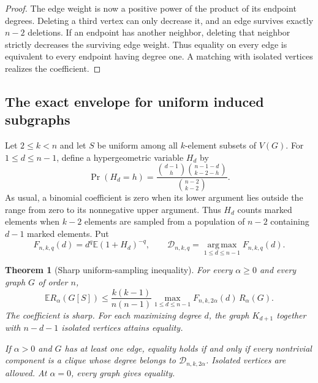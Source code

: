 \documentclass[11pt,a4paper]{article}
\newtheorem{theorem}{Theorem}[section]
\theoremstyle{definition}
\theoremstyle{remark}
\begin{document}
\begin{proof}
The edge weight is now a positive power of the product of its endpoint
degrees.  Deleting a third vertex can only decrease it, and an edge survives
exactly $n-2$ deletions.  If an endpoint has another neighbor, deleting that
neighbor strictly decreases the surviving edge weight.  Thus equality on
every edge is equivalent to every endpoint having degree one.  A matching
with isolated vertices realizes the coefficient.
\end{proof}

\subsection{The exact envelope for uniform induced subgraphs}
\label{g-sub-sampling}

Let $2\le k<n$ and let $S$ be uniform among all $k$-element subsets of
$V(G)$.  For $1\le d\le n-1$, define a hypergeometric variable $H_d$ by
\begin{equation}
 \Pr(H_d=h)=
 \frac{\binom{d-1}{h}\binom{n-1-d}{k-2-h}}
      {\binom{n-2}{k-2}}.
 \label{g-eq-hypergeom}
\end{equation}
As usual, a binomial coefficient is zero when its lower argument lies
outside the range from zero to its nonnegative upper argument.  Thus
$H_d$ counts marked elements when $k-2$ elements are sampled from a
population of $n-2$ containing $d-1$ marked elements.  Put
\begin{equation}
 F_{n,k,q}(d)=d^q\mathbb E(1+H_d)^{-q},\qquad
 \mathcal D_{n,k,q}=\operatorname*{arg\,max}_{1\le d\le n-1}
                    F_{n,k,q}(d).
 \label{g-eq-sampling-F}
\end{equation}

\begin{theorem}[Sharp uniform-sampling inequality]
\label{g-thm-sampling}
For every $\alpha\ge0$ and every graph $G$ of order $n$,
\begin{equation}
 \mathbb E R_\alpha(G[S])\le
 \frac{k(k-1)}{n(n-1)}
 \max_{1\le d\le n-1}F_{n,k,2\alpha}(d)\,R_\alpha(G).
 \label{g-eq-sampling-main}
\end{equation}
The coefficient is sharp.  For each maximizing degree $d$, the graph
$K_{d+1}$ together with $n-d-1$ isolated vertices attains equality.

If $\alpha>0$ and $G$ has at least one edge, equality holds if and only if
every nontrivial component is a clique whose degree belongs to
$\mathcal D_{n,k,2\alpha}$.  Isolated vertices are allowed.  At $\alpha=0$,
every graph gives equality.
\end{theorem}
\end{document}
